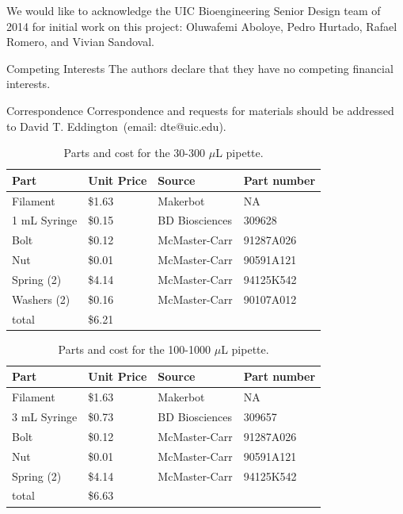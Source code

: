 \documentclass{naturegraphicx}
\begin{document}

\begin{addendum}
 \item We would like to acknowledge the UIC Bioengineering Senior Design team of 2014 for initial work on this project: Oluwafemi Aboloye, Pedro Hurtado, Rafael Romero, and Vivian Sandoval.
 \item[Competing Interests] The authors declare that they have no
competing financial interests.
 \item[Correspondence] Correspondence and requests for materials
should be addressed to David T. Eddington~(email: dte@uic.edu).
\end{addendum}

\begin{table}
\centering
\caption{Parts and cost for the 30-300 $\mu$L pipette.}
\label{table1}
\medskip
\begin{tabular}{|l|l|l|l|}
\hline
Part         & Unit Price & Source         & Part number \\ \hline
Filament     & \$1.63     & Makerbot       & NA          \\ \hline
1 mL Syringe & \$0.15     & BD Biosciences & 309628      \\ \hline
Bolt         & \$0.12     & McMaster-Carr  & 91287A026   \\ \hline
Nut          & \$0.01     & McMaster-Carr  & 90591A121   \\ \hline
Spring (2)   & \$4.14     & McMaster-Carr  & 94125K542   \\ \hline
Washers (2)  & \$0.16     & McMaster-Carr  & 90107A012   \\ \hline
total        & \$6.21     &                &             \\ \hline
\end{tabular}
\end{table}

\begin{table}
\centering
\caption{Parts and cost for the 100-1000 $\mu$L pipette.}
\label{table2}
\medskip
\begin{tabular}{|l|l|l|l|}
\hline
Part         & Unit Price & Source         & Part number \\ \hline
Filament     & \$1.63     & Makerbot       & NA          \\ \hline
3 mL Syringe & \$0.73     & BD Biosciences & 309657      \\ \hline
Bolt         & \$0.12     & McMaster-Carr  & 91287A026   \\ \hline
Nut          & \$0.01     & McMaster-Carr  & 90591A121   \\ \hline
Spring (2)   & \$4.14     & McMaster-Carr  & 94125K542   \\ \hline
total        & \$6.63     &                &             \\ \hline
\end{tabular}
\end{table}
\end{document}
